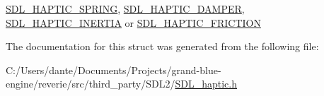 \mbox{\hyperlink{_s_d_l__haptic_8h_a3b52d4700380085e2b5d87bb20320fb1}{S\+D\+L\+\_\+\+H\+A\+P\+T\+I\+C\+\_\+\+S\+P\+R\+I\+NG}}, \mbox{\hyperlink{_s_d_l__haptic_8h_a69522f261973e3ea4273486141320a87}{S\+D\+L\+\_\+\+H\+A\+P\+T\+I\+C\+\_\+\+D\+A\+M\+P\+ER}}, \mbox{\hyperlink{_s_d_l__haptic_8h_a14b807471589120395aec28293cf6642}{S\+D\+L\+\_\+\+H\+A\+P\+T\+I\+C\+\_\+\+I\+N\+E\+R\+T\+IA}} or \mbox{\hyperlink{_s_d_l__haptic_8h_a98a5011311168d63921aaac21403a4d8}{S\+D\+L\+\_\+\+H\+A\+P\+T\+I\+C\+\_\+\+F\+R\+I\+C\+T\+I\+ON}} 

The documentation for this struct was generated from the following file\+:\begin{DoxyCompactItemize}
\item 
C\+:/\+Users/dante/\+Documents/\+Projects/grand-\/blue-\/engine/reverie/src/third\+\_\+party/\+S\+D\+L2/\mbox{\hyperlink{_s_d_l__haptic_8h}{S\+D\+L\+\_\+haptic.\+h}}\end{DoxyCompactItemize}
